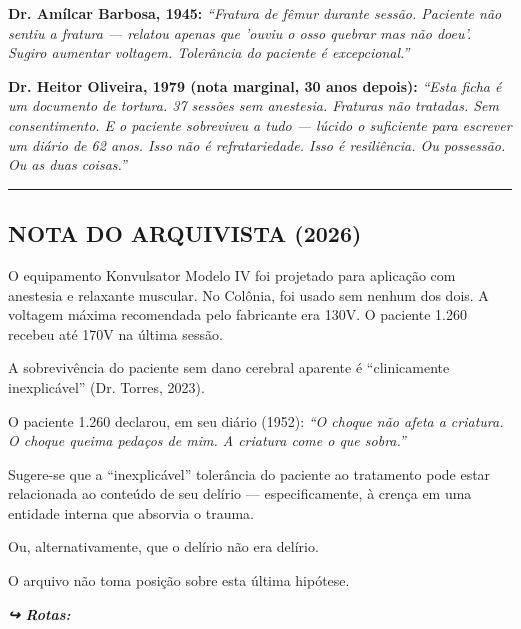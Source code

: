 \noindent \textbf{Dr. Amílcar Barbosa, 1945:}
\textit{\textquotedblleft{}Fratura de fêmur durante sessão. Paciente não sentiu a fratura --- relatou apenas que 'ouviu o osso quebrar mas não doeu'. Sugiro aumentar voltagem. Tolerância do paciente é excepcional.\textquotedblright{}}

\noindent \textbf{Dr. Heitor Oliveira, 1979 (nota marginal, 30 anos depois):}
\textit{\textquotedblleft{}Esta ficha é um documento de tortura. 37 sessões sem anestesia. Fraturas não tratadas. Sem consentimento. E o paciente sobreviveu a tudo --- lúcido o suficiente para escrever um diário de 62 anos. Isso não é refratariedade. Isso é resiliência. Ou possessão. Ou as duas coisas.\textquotedblright{}}

\vspace{0.5em}\noindent\rule{\textwidth}{0.5pt}\vspace{0.5em}

\subsection*{NOTA DO ARQUIVISTA (2026)}

\noindent O equipamento Konvulsator Modelo IV foi projetado para aplicação com anestesia e relaxante muscular. No Colônia, foi usado sem nenhum dos dois. A voltagem máxima recomendada pelo fabricante era 130V. O paciente 1.260 recebeu até 170V na última sessão.

\noindent A sobrevivência do paciente sem dano cerebral aparente é \textquotedblleft{}clinicamente inexplicável\textquotedblright{} (Dr. Torres, 2023).

\noindent O paciente 1.260 declarou, em seu diário (1952): \textit{\textquotedblleft{}O choque não afeta a criatura. O choque queima pedaços de mim. A criatura come o que sobra.\textquotedblright{}}

\noindent Sugere-se que a \textquotedblleft{}inexplicável\textquotedblright{} tolerância do paciente ao tratamento pode estar relacionada ao conteúdo de seu delírio --- especificamente, à crença em uma entidade interna que absorvia o trauma.

\noindent Ou, alternativamente, que o delírio não era delírio.

\noindent O arquivo não toma posição sobre esta última hipótese.

\vspace{0.5em}
\noindent\textit{\textbf{↪ Rotas:}  \rotasep {} \rotasep {}}